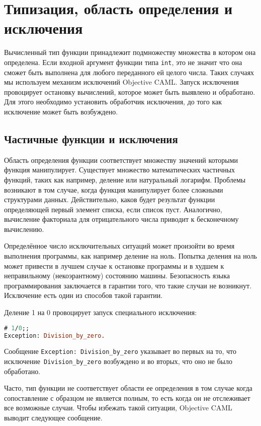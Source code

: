 \section{Типизация, область определения и исключения}
\label{sec:typing_domain_of_definition_and_exceptions}

Вычисленный тип функции принадлежит подмножеству множества в котором она
определена. Если входной аргумент функции типа \texttt{int}, это не значит что
она сможет быть выполнена для любого переданного ей целого числа. Таких случаях
мы используем механизм исключений Objective CAML. Запуск исключения провоцирует
остановку вычислений, которое может быть выявлено и обработано. Для этого
необходимо установить обработчик исключения, до того как исключение может быть
возбуждено.

\subsection{Частичные функции и исключения}

Область определения функции соответствует множеству значений которыми функция
манипулирует. Существует множество математических частичных функций, таких как
например, деление или натуральный логарифм. Проблемы возникают в том случае,
когда функция манипулирует более сложными структурами данных. Действительно,
каков будет результат функции определяющей первый элемент списка, если список
пуст. Аналогично, вычисление факториала для отрицательного числа приводит к
бесконечному вычислению.

Определённое число исключительных ситуаций может произойти во время выполнения
программы, как например деление на ноль. Попытка деления на ноль может привести
в лучшем случае к остановке программы и в худшем к неправильному (некоэрантному)
состоянию машины. Безопасность языка программирования заключается в гарантии
того, что такие случаи не возникнут. Исключение есть один из способов такой
гарантии.

Деление 1 на 0 провоцирует запуск специального исключения:

\begin{lstlisting}[language=OCaml]
# 1/0;;
Exception: Division_by_zero.
\end{lstlisting}

Сообщение \texttt{Exception: Division\_by\_zero} указывает во первых на то, что
исключение\texttt{ Division\_by\_zero} возбуждено и во вторых, что оно не было
обработано.

Часто, тип функции не соответствует области ее определения в том случае когда
сопоставление с образцом не является полным, то есть когда он не отслеживает все
возможные случаи. Чтобы избежать такой ситуации, Objective CAML выводит
следующее сообщение.


